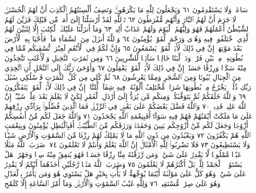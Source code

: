 سَاعَةࣰ وَلَا يَسْتَقْدِمُونَ ٦١ وَيَجْعَلُونَ لِلَّهِ مَا يَكْرَهُونَۚ وَتَصِفُ
أَلْسِنَتُهُمُ ٱلْكَذِبَ أَنَّ لَهُمُ ٱلْحُسْنَىٰۚ لَا جَرَمَ أَنَّ لَهُمُ ٱلنَّارَ
وَأَنَّهُم مُّفْرَطُونَ ٦٢ تَٱللَّهِ لَقَدْ أَرْسَلْنَآ إِلَىٰٓ أُمَمࣲ مِّن قَبْلِكَ
فَزَيَّنَ لَهُمُ ٱلشَّيْطَٰنُ أَعْمَٰلَهُمْ فَهُوَ وَلِيُّهُمُ ٱلْيَوْمَ وَلَهُمْ
عَذَابٌ أَلِيمࣱ ٦٣ وَمَآ أَنزَلْنَا عَلَيْكَ ٱلْكِتَٰبَ إِلَّا لِتُبَيِّنَ لَهُمُ
ٱلَّذِي ٱخْتَلَفُوا۟ فِيهِ وَهُدࣰى وَرَحْمَةࣰ لِّقَوْمࣲ يُؤْمِنُونَ ٦٤
وَٱللَّهُ أَنزَلَ مِنَ ٱلسَّمَآءِ مَآءࣰ فَأَحْيَا بِهِ ٱلْأَرْضَ بَعْدَ مَوْتِهَآۚ إِنَّ فِي
ذَٰلِكَ لَأٓيَةࣰ لِّقَوْمࣲ يَسْمَعُونَ ٦٥ وَإِنَّ لَكُمْ فِي ٱلْأَنْعَٰمِ لَعِبْرَةࣰۖ نُّسْقِيكُم
مِّمَّا فِي بُطُونِهِۦ مِنۢ بَيْنِ فَرْثࣲ وَدَمࣲ لَّبَنًا خَالِصࣰا سَآئِغࣰا لِّلشَّٰرِبِينَ ٦٦
وَمِن ثَمَرَٰتِ ٱلنَّخِيلِ وَٱلْأَعْنَٰبِ تَتَّخِذُونَ مِنْهُ سَكَرࣰا وَرِزْقًا
حَسَنًاۚ إِنَّ فِي ذَٰلِكَ لَأٓيَةࣰ لِّقَوْمࣲ يَعْقِلُونَ ٦٧ وَأَوْحَىٰ رَبُّكَ إِلَى ٱلنَّحْلِ
أَنِ ٱتَّخِذِي مِنَ ٱلْجِبَالِ بُيُوتࣰا وَمِنَ ٱلشَّجَرِ وَمِمَّا يَعْرِشُونَ ٦٨ ثُمَّ
كُلِي مِن كُلِّ ٱلثَّمَرَٰتِ فَٱسْلُكِي سُبُلَ رَبِّكِ ذُلُلࣰاۚ يَخْرُجُ مِنۢ بُطُونِهَا
شَرَابࣱ مُّخْتَلِفٌ أَلْوَٰنُهُۥ فِيهِ شِفَآءࣱ لِّلنَّاسِۚ إِنَّ فِي ذَٰلِكَ لَأٓيَةࣰ لِّقَوْمࣲ
يَتَفَكَّرُونَ ٦٩ وَٱللَّهُ خَلَقَكُمْ ثُمَّ يَتَوَفَّىٰكُمْۚ وَمِنكُم مَّن يُرَدُّ إِلَىٰٓ
أَرْذَلِ ٱلْعُمُرِ لِكَيْ لَا يَعْلَمَ بَعْدَ عِلْمࣲ شَيْـًٔاۚ إِنَّ ٱللَّهَ عَلِيمࣱ قَدِيرࣱ ٧٠
وَٱللَّهُ فَضَّلَ بَعْضَكُمْ عَلَىٰ بَعْضࣲ فِي ٱلرِّزْقِۚ فَمَا ٱلَّذِينَ فُضِّلُوا۟
بِرَآدِّي رِزْقِهِمْ عَلَىٰ مَا مَلَكَتْ أَيْمَٰنُهُمْ فَهُمْ فِيهِ سَوَآءٌۚ أَفَبِنِعْمَةِ
ٱللَّهِ يَجْحَدُونَ ٧١ وَٱللَّهُ جَعَلَ لَكُم مِّنْ أَنفُسِكُمْ أَزْوَٰجࣰا
وَجَعَلَ لَكُم مِّنْ أَزْوَٰجِكُم بَنِينَ وَحَفَدَةࣰ وَرَزَقَكُم مِّنَ
ٱلطَّيِّبَٰتِۚ أَفَبِٱلْبَٰطِلِ يُؤْمِنُونَ وَبِنِعْمَتِ ٱللَّهِ هُمْ يَكْفُرُونَ ٧٢
وَيَعْبُدُونَ مِن دُونِ ٱللَّهِ مَا لَا يَمْلِكُ لَهُمْ رِزْقࣰا مِّنَ ٱلسَّمَٰوَٰتِ
وَٱلْأَرْضِ شَيْـࣰٔا وَلَا يَسْتَطِيعُونَ ٧٣ فَلَا تَضْرِبُوا۟ لِلَّهِ ٱلْأَمْثَالَۚ
إِنَّ ٱللَّهَ يَعْلَمُ وَأَنتُمْ لَا تَعْلَمُونَ ٧٤۞ ضَرَبَ ٱللَّهُ مَثَلًا عَبْدࣰا
مَّمْلُوكࣰا لَّا يَقْدِرُ عَلَىٰ شَيْءࣲ وَمَن رَّزَقْنَٰهُ مِنَّا رِزْقًا حَسَنࣰا
فَهُوَ يُنفِقُ مِنْهُ سِرࣰّا وَجَهْرًاۖ هَلْ يَسْتَوُۥنَۚ ٱلْحَمْدُ لِلَّهِۚ
بَلْ أَكْثَرُهُمْ لَا يَعْلَمُونَ ٧٥ وَضَرَبَ ٱللَّهُ مَثَلࣰا رَّجُلَيْنِ
أَحَدُهُمَآ أَبْكَمُ لَا يَقْدِرُ عَلَىٰ شَيْءࣲ وَهُوَ كَلٌّ عَلَىٰ مَوْلَىٰهُ
أَيْنَمَا يُوَجِّههُّ لَا يَأْتِ بِخَيْرٍ هَلْ يَسْتَوِي هُوَ وَمَن يَأْمُرُ
بِٱلْعَدْلِ وَهُوَ عَلَىٰ صِرَٰطࣲ مُّسْتَقِيمࣲ ٧٦ وَلِلَّهِ غَيْبُ
ٱلسَّمَٰوَٰتِ وَٱلْأَرْضِۚ وَمَآ أَمْرُ ٱلسَّاعَةِ إِلَّا كَلَمْحِ
